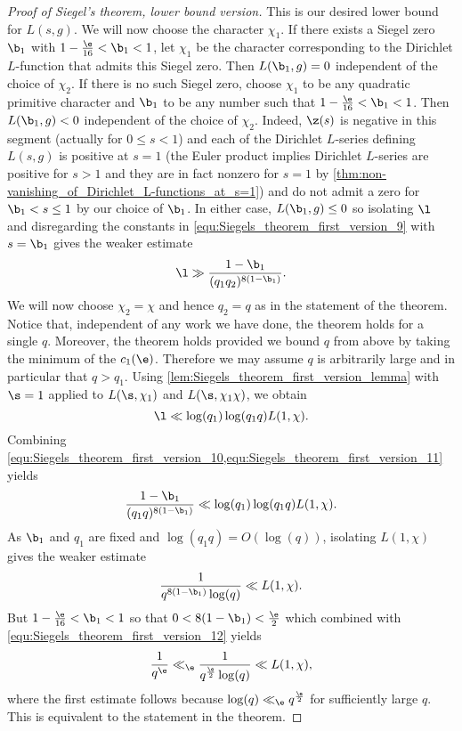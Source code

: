 \begin{proof}[Proof of Siegel's theorem, lower bound version]
      This is our desired lower bound for $L(s,g)$. We will now choose the character $\chi_{1}$. If there exists a Siegel zero $\b_{1}$ with $1-\frac{\e}{16} < \b_{1} < 1$, let $\chi_{1}$ be the character corresponding to the Dirichlet $L$-function that admits this Siegel zero. Then $L(\b_{1},g) = 0$ independent of the choice of $\chi_{2}$. If there is no such Siegel zero, choose $\chi_{1}$ to be any quadratic primitive character and $\b_{1}$ to be any number such that $1-\frac{\e}{16} < \b_{1} < 1$. Then $L(\b_{1},g) < 0$ independent of the choice of $\chi_{2}$. Indeed, $\z(s)$ is negative in this segment (actually for $0 \le s < 1$) and each of the Dirichlet $L$-series defining $L(s,g)$ is positive at $s = 1$ (the Euler product implies Dirichlet $L$-series are positive for $s > 1$ and they are in fact nonzero for $s = 1$ by \cref{thm:non-vanishing_of_Dirichlet_L-functions_at_s=1}) and do not admit a zero for $\b_{1} < s \le 1$ by our choice of $\b_{1}$. In either case, $L(\b_{1},g) \le 0$ so isolating $\l$ and disregarding the constants in \cref{equ:Siegels_theorem_first_version_9} with $s = \b_{1}$ gives the weaker estimate
      \begin{equation}\label{equ:Siegels_theorem_first_version_10}
        \l \gg \frac{1-\b_{1}}{(q_{1}q_{2})^{8(1-\b_{1})}}.
      \end{equation}
      We will now choose $\chi_{2} = \chi$ and hence $q_{2} = q$ as in the statement of the theorem. Notice that, independent of any work we have done, the theorem holds for a single $q$. Moreover, the theorem holds provided we bound $q$ from above by taking the minimum of the $c_{1}(\e)$. Therefore we may assume $q$ is arbitrarily large and in particular that $q > q_{1}$. Using \cref{lem:Siegels_theorem_first_version_lemma} with $\s = 1$ applied to $L(\s,\chi_{1})$ and $L(\s,\chi_{1}\chi)$, we obtain
      \begin{equation}\label{equ:Siegels_theorem_first_version_11}
        \l \ll \log(q_{1})\log(q_{1}q)L(1,\chi).
      \end{equation}
      Combining \cref{equ:Siegels_theorem_first_version_10,equ:Siegels_theorem_first_version_11} yields
      \[
        \frac{1-\b_{1}}{(q_{1}q)^{8(1-\b_{1})}} \ll \log(q_{1})\log(q_{1}q)L(1,\chi).
      \]
      As $\b_{1}$ and $q_{1}$ are fixed and $\log(q_{1}q) = O(\log(q))$, isolating $L(1,\chi)$ gives the weaker estimate
      \begin{equation}\label{equ:Siegels_theorem_first_version_12}
        \frac{1}{q^{8(1-\b_{1})}\log(q)} \ll L(1,\chi).
      \end{equation}
      But $1-\frac{\e}{16} < \b_{1} < 1$ so that $0 < 8(1-\b_{1}) < \frac{\e}{2}$ which combined with \cref{equ:Siegels_theorem_first_version_12} yields
      \[
        \frac{1}{q^{\e}} \ll_{\e} \frac{1}{q^{\frac{\e}{2}}\log(q)} \ll L(1,\chi),
      \]
      where the first estimate follows because $\log(q) \ll_{\e} q^{\frac{\e}{2}}$ for sufficiently large $q$. This is equivalent to the statement in the theorem.
    \end{proof}

